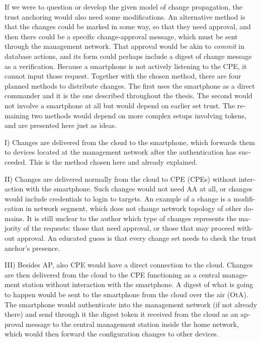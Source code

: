 \documentclass[12pt,a4paper,english]{tutthesis}
\begin{document}
\begin{otherlanguage}{english}
If we were to question or develop the given model of change
propagation, the trust anchoring would also need some modifications.
An alternative method is that the changes could be marked in some way, so
that they need approval, and then there could be a specific
change-approval message, which must be sent through the management
network. That approval would be akin to \emph{commit} in database actions,
and its form could perhaps include a digest of change message as a verification.
Because a smartphone is not actively listening to the CPE, it cannot input
those request. Together with the chosen method, there are four planned
methods to distribute changes. The first uses the smartphone as a
direct commander and it is the one described throughout the thesis.
The second would not involve a smartphone at all but would  depend on
earlier set trust. The remaining two methods would depend on more complex
setups involving tokens, and are presented here just as ideas.


I) Changes are delivered from the cloud to the smartphone, which forwards them
   to devices located at the management network after the
   authentication has succeeded. This is the method chosen here and
   already explained.

II) Changes are delivered normally from the cloud to CPE (CPEs) without
   interaction with the smartphone. Such changes would not need AA at
   all, or changes would include credentials to login to targets. An example
   of a change is a modification in network segment, which does not
   change network topology of other domains.  It is still unclear to
   the author which type of changes represents the majority of the
   requests: those that need approval, or those that may proceed
   without approval. An educated guess is that every change set needs
   to check the trust anchor's presence.



III) Besides AP, also CPE would have a direct connection to the
   cloud. Changes are then delivered from the cloud to the CPE functioning as a central
   management station without interaction with the smartphone. A digest
   of what is going to happen would be sent to the smartphone from the
   cloud over the air (OtA). The smartphone would authenticate into the
   management network (if not already there) and send through it the
   digest token it received from the cloud as an approval message to
   the central management station inside the home network, which would then
   forward the configuration changes to other devices.


\end{otherlanguage}
\end{document}
